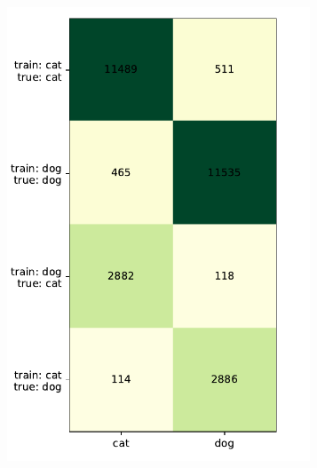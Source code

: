 \documentclass[a4paper,11pt]{scrartcl}
\theoremstyle{definition}
\begin{document}
\begin{figure}[H]
\centering
\begin{subfigure}[t]{0.32\textwidth}
\includegraphics[width=0.99\textwidth]{Plots_2/compound_3000_20_20_no_Title_same_scale.pdf}
\label{subfig:confusion_20_20}
\end{subfigure}
\begin{subfigure}[t]{0.32\textwidth}

\end{subfigure}
\end{figure}
\end{document}
